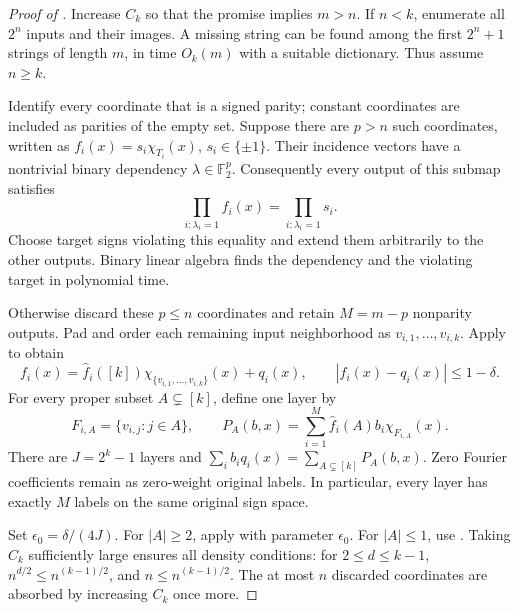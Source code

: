 \documentclass[letterpaper,11pt]{article}
\theoremstyle{definition}
\newcommand{\F}{\mathbb F}
\begin{document}
\begin{proof}[Proof of ]
Increase $C_k$ so that the promise implies $m>n$. If $n<k$,
enumerate all $2^n$ inputs and their images. A missing string can
be found among the first $2^n+1$ strings of length $m$, in time
$O_k(m)$ with a suitable dictionary. Thus assume $n\ge k$.

Identify every coordinate that is a signed parity; constant
coordinates are included as parities of the empty set.
Suppose there are $p>n$ such coordinates, written as
$f_i(x)=s_i\chi_{T_i}(x)$, $s_i\in\{\pm1\}$. Their incidence
vectors have a nontrivial binary dependency $\lambda\in\F_2^p$.
Consequently every output of this submap satisfies
\[
 \prod_{i:\lambda_i=1}f_i(x)
 =\prod_{i:\lambda_i=1}s_i.
\]
Choose target signs violating this equality and extend them arbitrarily
to the other outputs. Binary linear algebra finds the dependency and
the violating target in polynomial time.

Otherwise discard these $p\le n$ coordinates and retain $M=m-p$
nonparity outputs. Pad and order each remaining input neighborhood as
$v_{i,1},\ldots,v_{i,k}$. Apply  to obtain
\begin{equation}
 f_i(x)=\widehat f_i([k])\chi_{\{v_{i,1},\ldots,v_{i,k}\}}(x)
            +q_i(x),\qquad
 |f_i(x)-q_i(x)|\le1-\delta.
 \label{eq:coordinate-split}
\end{equation}
For every proper subset $A\subsetneq[k]$, define one layer by
\[
 F_{i,A}=\{v_{i,j}:j\in A\},\qquad
 P_A(b,x)=\sum_{i=1}^M\widehat f_i(A)b_i\chi_{F_{i,A}}(x).
\]
There are $J=2^k-1$ layers and
$\sum_i b_iq_i(x)=\sum_{A\subsetneq[k]}P_A(b,x)$.
Zero Fourier coefficients remain as zero-weight original labels.
In particular, every layer has exactly $M$ labels on the same
original sign space.

Set $\epsilon_0=\delta/(4J)$. For $|A|\ge2$, apply
 with parameter $\epsilon_0$. For $|A|\le1$,
use . Taking $C_k$ sufficiently large
ensures all density conditions: for $2\le d\le k-1$,
$n^{d/2}\le n^{(k-1)/2}$, and
$n\le n^{(k-1)/2}$. The at most $n$ discarded coordinates are
absorbed by increasing $C_k$ once more.


\end{proof}
\end{document}
